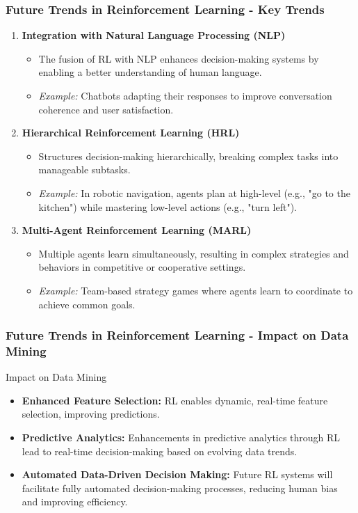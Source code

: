 \documentclass[aspectratio=169]{beamer}
\begin{document}
\begin{frame}[fragile]
    \frametitle{Future Trends in Reinforcement Learning - Key Trends}
    \begin{enumerate}
        \item \textbf{Integration with Natural Language Processing (NLP)}
        \begin{itemize}
            \item The fusion of RL with NLP enhances decision-making systems by enabling a better understanding of human language.
            \item \textit{Example:} Chatbots adapting their responses to improve conversation coherence and user satisfaction.
        \end{itemize}

        \item \textbf{Hierarchical Reinforcement Learning (HRL)}
        \begin{itemize}
            \item Structures decision-making hierarchically, breaking complex tasks into manageable subtasks.
            \item \textit{Example:} In robotic navigation, agents plan at high-level (e.g., "go to the kitchen") while mastering low-level actions (e.g., "turn left").
        \end{itemize}

        \item \textbf{Multi-Agent Reinforcement Learning (MARL)}
        \begin{itemize}
            \item Multiple agents learn simultaneously, resulting in complex strategies and behaviors in competitive or cooperative settings.
            \item \textit{Example:} Team-based strategy games where agents learn to coordinate to achieve common goals.
        \end{itemize}
    \end{enumerate}
\end{frame}

\begin{frame}[fragile]
    \frametitle{Future Trends in Reinforcement Learning - Impact on Data Mining}
    \begin{block}{Impact on Data Mining}
        \begin{itemize}
            \item \textbf{Enhanced Feature Selection:} 
            RL enables dynamic, real-time feature selection, improving predictions.
            \item \textbf{Predictive Analytics:} 
            Enhancements in predictive analytics through RL lead to real-time decision-making based on evolving data trends.
            \item \textbf{Automated Data-Driven Decision Making:} 
            Future RL systems will facilitate fully automated decision-making processes, reducing human bias and improving efficiency.
        \end{itemize}
    \end{block}
\end{frame}
\end{document}
